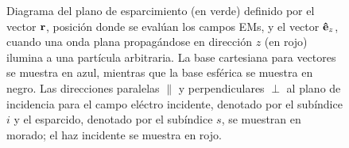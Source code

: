 \begin{figure}[h!]
%
\caption{Diagrama del plano de esparcimiento (en verde) definido por el vector $\vb{r}$, posición donde se evalúan los campos EMs, y el vector $\vu{e}_z$, cuando una onda plana propagándose en dirección $z$ (en rojo) ilumina a una partícula arbitraria.  La base cartesiana para vectores se muestra en azul, mientras que la base esférica se muestra en negro.  Las direcciones paralelas $\parallel$ y perpendiculares $\perp$ al plano de incidencia  para el campo eléctro incidente, denotado por el subíndice $i$ y el esparcido, denotado por el subíndice $s$, se muestran en morado; el haz incidente se muestra en rojo.}\label{fig:PlanoEsparcimiento}
	\end{figure}	

